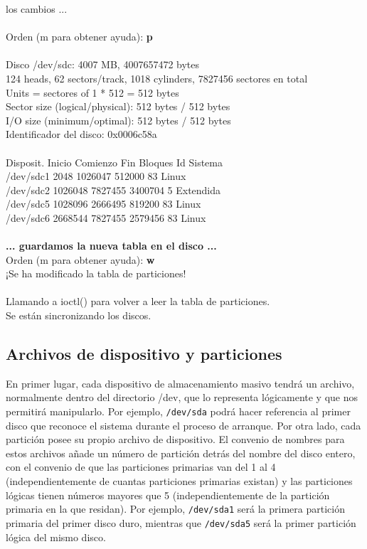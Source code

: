 \documentclass[12pt]{article}
\begin{document}
{{los cambios ...}\\
\\
Orden (m para obtener ayuda):  {\bf p}\\
\\
Disco /dev/sdc: 4007 MB, 4007657472 bytes\\
124 heads, 62 sectors/track, 1018 cylinders, 7827456 sectores en total\\
Units = sectores of 1 * 512 = 512 bytes\\
Sector size (logical/physical): 512 bytes / 512 bytes\\
I/O size (minimum/optimal): 512 bytes / 512 bytes\\
Identificador del disco: 0x0006c58a\\
\\
Disposit. Inicio    Comienzo      Fin      Bloques  Id  Sistema\\
/dev/sdc1            2048     1026047      512000   83  Linux\\
/dev/sdc2         1026048     7827455     3400704    5  Extendida\\
/dev/sdc5         1028096     2666495      819200   83  Linux\\
/dev/sdc6         2668544     7827455     2579456   83  Linux\\
\\
\textbf{... guardamos la nueva tabla en el disco  ...}\\
Orden (m para obtener ayuda): {\bf w}\\
¡Se ha modificado la tabla de particiones!\\
\\
Llamando a ioctl() para volver a leer la tabla de particiones.\\
Se están sincronizando los discos.\\
}

\subsection*{Archivos de dispositivo y particiones}

En primer lugar, cada dispositivo de almacenamiento masivo tendrá un archivo, 
normalmente dentro del directorio /dev, que lo representa lógicamente y que 
nos permitirá manipularlo. Por ejemplo, {\tt /dev/sda} podrá hacer referencia
al primer disco que reconoce el sistema durante el proceso de arranque.  
Por otra lado, cada partición posee su propio archivo de dispositivo. El 
convenio de nombres para estos archivos 
añade un número de partición detrás del nombre del disco entero, con el 
convenio de que las particiones primarias van del 1 al 4 
(independientemente de cuantas particiones primarias existan) y las 
particiones lógicas tienen números mayores que 5 
(independientemente de la partición primaria en la que residan). Por 
ejemplo, \texttt{/dev/sda1} será la primera partición primaria del primer
disco duro, mientras que \texttt{/dev/sda5} será la primer partición 
lógica del mismo disco.
\end{document}
